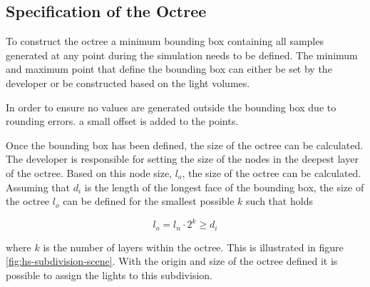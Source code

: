 \subsection{Specification of the Octree}



To construct the octree a minimum bounding box containing all samples generated
at any point during the simulation needs to be defined. The minimum and maximum point
that define the bounding box can either be set by the developer or be constructed based
on the light volumes.

In order to ensure no values are generated outside the bounding box due to rounding errors.
a small offset is added to the points.

Once the bounding box has been defined, the size of the octree can be calculated.
The developer is responsible for setting the size of the nodes in the deepest layer of
the octree. Based on this node size, $\mathit{l}_o$, the size of the octree can be calculated.
Assuming that $\mathit{d}_i$ is the length of the longest face of the bounding box, the
size of the octree $\mathit{l}_o$ can be defined for the smallest possible $k$ such that holds

\begin{equation*}
  \mathit{l}_o = \mathit{l}_n \cdot 2^k \geq \mathit{d}_i
\end{equation*}

\noindent where $k$ is the number of layers within the octree. This is illustrated in figure
\ref{fig:hs-subdivision-scene}. With the origin and size of the octree defined it is possible to assign the
lights to this subdivision.



